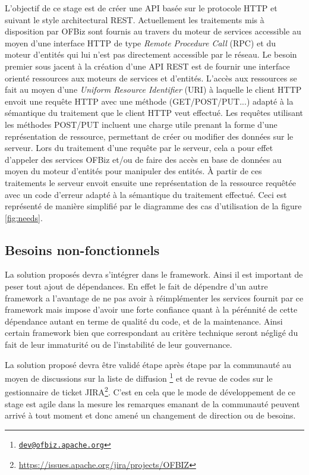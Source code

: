 \documentclass[a4paper, 11pt]{report}
\begin{document}
L'objectif de ce stage est de créer une API basée sur le protocole
HTTP et suivant le style architectural REST.  Actuellement les
traitements mis à disposition par OFBiz sont fournis au travers du
moteur de services accessible au moyen d'une interface HTTP de type
\emph{Remote Procedure Call} (RPC) et du moteur d'entités qui lui
n'est pas directement accessible par le réseau.  Le besoin premier
sous jacent à la création d'une API REST est de fournir une interface
orienté ressources aux moteurs de services et d'entités.  L'accès aux
ressources se fait au moyen d'une \emph{Uniform Resource Identifier}
(URI) à laquelle le client HTTP envoit une requête HTTP avec une
méthode (GET/POST/PUT...) adapté à la sémantique du traitement que le
client HTTP veut effectué.  Les requêtes utilisant les méthodes
POST/PUT incluent une charge utile prenant la forme d'une
représentation de ressource, permettant de créer ou modifier des
données sur le serveur.  Lors du traitement d'une requête par le
serveur, cela a pour effet d'appeler des services OFBiz et/ou de faire
des accès en base de données au moyen du moteur d'entités pour
manipuler des entités.  À partir de ces traitements le serveur envoit
ensuite une représentation de la ressource requêtée avec un code
d'erreur adapté à la sémantique du traitement effectué.  Ceci est
représenté de manière simplifié par le diagramme des cas d'utilisation
de la figure \ref{fig:needs}.

\subsection{Besoins non-fonctionnels}

La solution proposés devra s'intégrer dans le framework. Ainsi il est
important de peser tout ajout de dépendances.  En effet le fait de
dépendre d'un autre framework a l'avantage de ne pas avoir à
réimplémenter les services fournit par ce framework mais impose
d'avoir une forte confiance quant à la pérénnité de cette dépendance
autant en terme de qualité du code, et de la maintenance.  Ainsi
certain framework bien que correspondant au critère technique seront
négligé du fait de leur immaturité ou de l'instabilité de leur
gouvernance.

La solution proposé devra être validé étape après étape par la
communauté au moyen de discussions sur la liste de diffusion
\footnote{\href{mailto:dev@ofbiz.apache.org}{\nolinkurl{dev@ofbiz.apache.org}}}
et de revue de codes sur le gestionnaire de ticket
JIRA\footnote{\url{https://issues.apache.org/jira/projects/OFBIZ}}. C'est
en cela que le mode de développement de ce stage est agile dans la
mesure les remarques emanant de la communauté peuvent arrivé à tout
moment et donc amené un changement de direction ou de besoins.
\end{document}
